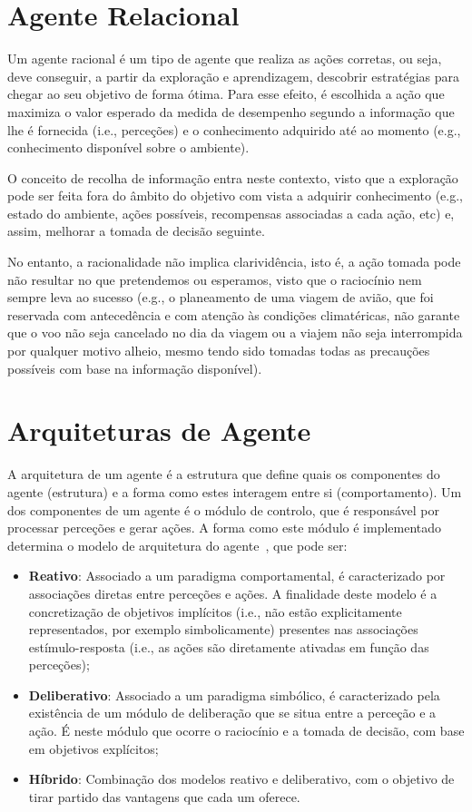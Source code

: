 \section{Agente Relacional}\label{sec:agente-relacional}

Um agente racional é um tipo de agente que realiza as ações corretas, ou seja, deve conseguir, a partir da exploração e aprendizagem, descobrir estratégias para chegar ao seu objetivo de forma ótima.
Para esse efeito, é escolhida a ação que maximiza o valor esperado da medida de desempenho segundo a informação que lhe é fornecida (i.e., perceções) e o conhecimento adquirido até ao momento (e.g., conhecimento disponível sobre o ambiente).

O conceito de recolha de informação entra neste contexto, visto que a exploração pode ser feita fora do âmbito do objetivo com vista a adquirir conhecimento (e.g., estado do ambiente, ações possíveis, recompensas associadas a cada ação, etc) e, assim, melhorar a tomada de decisão seguinte.

No entanto, a racionalidade não implica clarividência, isto é, a ação tomada pode não resultar no que pretendemos ou esperamos, visto que o raciocínio nem sempre leva ao sucesso (e.g., o planeamento de uma viagem de avião, que foi reservada com antecedência e com atenção às condições climatéricas, não garante que o voo não seja cancelado no dia da viagem ou a viajem não seja interrompida por qualquer motivo alheio, mesmo tendo sido tomadas todas as precauções possíveis com base na informação disponível).


\section{Arquiteturas de Agente}\label{sec:arquiteturas-agente}

A arquitetura de um agente é a estrutura que define quais os componentes do agente (estrutura) e a forma como estes interagem entre si (comportamento).
Um dos componentes de um agente é o módulo de controlo, que é responsável por processar perceções e gerar ações.
A forma como este módulo é implementado determina o modelo de arquitetura do agente~\cite{isel:iasa:slides:ia-intro}, que pode ser:

\begin{itemize}
    \item \textbf{Reativo}: Associado a um paradigma comportamental, é caracterizado por associações diretas entre perceções e ações.
    A finalidade deste modelo é a concretização de objetivos implícitos (i.e., não estão explicitamente representados, por exemplo simbolicamente) presentes nas associações estímulo-resposta (i.e., as ações são diretamente ativadas em função das perceções);
    \item \textbf{Deliberativo}: Associado a um paradigma simbólico, é caracterizado pela existência de um módulo de deliberação que se situa entre a perceção e a ação.
    É neste módulo que ocorre o raciocínio e a tomada de decisão, com base em objetivos explícitos;
    \item \textbf{Híbrido}: Combinação dos modelos reativo e deliberativo, com o objetivo de tirar partido das vantagens que cada um oferece.
\end{itemize}
